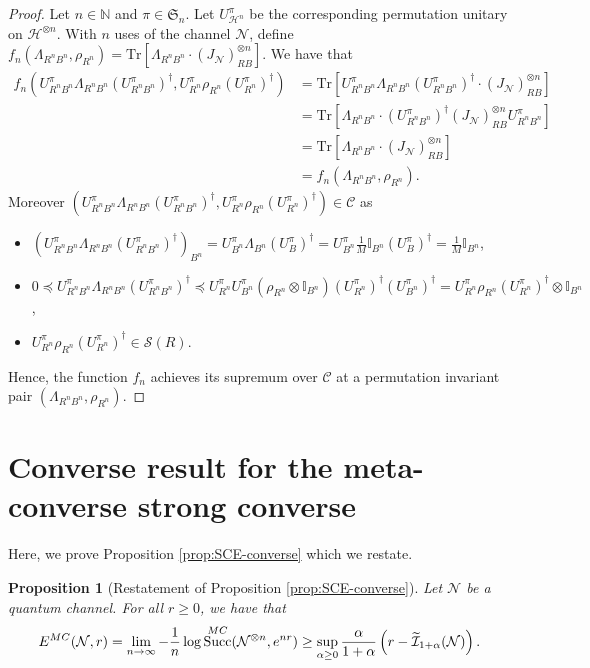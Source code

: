 \documentclass[a4paper,onecolumn,11pt,accepted=2025-10-01]{quantumarticle}
\newtheorem*{prop*}{Proposition}
\DeclareMathOperator{\suc}{Succ}
\newcommand*{\cC}{\mathcal{C}}
\newcommand*{\cH}{\mathcal{H}}
\newcommand*{\cI}{\mathcal{I}}
\newcommand*{\dI}{\mathbb{I}}
\newcommand*{\cN}{\mathcal{N}}
\newcommand*{\cS}{\mathcal{S}}
\newcommand*{\fS}{\mathfrak{S}}
\newcommand*{\tr}[1]{\mathrm{Tr}\left[#1\right]}
\newcommand*{\mle}{\preccurlyeq}
\begin{document}
\begin{proof}
Let $n\in \mathbb{N}$ and   $\pi \in \fS_n$. Let $U^\pi_{\cH^n}$ be the corresponding permutation unitary on $\cH^{\otimes n}$. With $n$ uses of the channel $\cN$, define $f_n(\Lambda_{R^nB^n}, \rho_{R^n})=\tr{\Lambda_{R^nB^n} \cdot (J_{\cN})_{RB}^{\otimes n}}$. We have that 
\begin{align}
    f_n(U^\pi_{R^nB^n} \Lambda_{R^nB^n} (U^\pi_{R^nB^n})^{\dagger}, U^\pi_{R^n} \rho_{R^n} (U^\pi_{R^n})^{\dagger} ) &= \tr{U^\pi_{R^nB^n}\Lambda_{R^nB^n}(U^\pi_{R^nB^n})^{\dagger} \cdot (J_{\cN})_{RB}^{\otimes n}}
    \\&=\tr{\Lambda_{R^nB^n} \cdot(U^\pi_{R^nB^n})^{\dagger} (J_{\cN})_{RB}^{\otimes n}U^\pi_{R^nB^n}}
    \\&= \tr{\Lambda_{R^nB^n} \cdot (J_{\cN})_{RB}^{\otimes n}}
    \\&=f_n(\Lambda_{R^nB^n}, \rho_{R^n}).
\end{align}
Moreover $(U^\pi_{R^nB^n} \Lambda_{R^nB^n} (U^\pi_{R^nB^n})^{\dagger}, U^\pi_{R^n} \rho_{R^n} (U^\pi_{R^n})^{\dagger})\in \cC$ as 
\begin{itemize}
    \item $(U^\pi_{R^nB^n} \Lambda_{R^nB^n} (U^\pi_{R^nB^n})^{\dagger})_{B^n}  = U^\pi_{B^n} \Lambda_{B^n}  (U^\pi_B)^{\dagger} = U^\pi_{B^n} \frac{1}{M}\dI_{B^n} (U^\pi_B)^{\dagger} = \frac{1}{M}\dI_{B^n} $,
    \item $0\mle U^\pi_{R^nB^n} \Lambda_{R^nB^n} (U^\pi_{R^nB^n})^{\dagger} \mle U^\pi_{R^n}U^\pi_{B^n} (\rho_{R^n} \otimes \dI_{B^n} ) (U^\pi_{R^n})^{\dagger}(U^\pi_{B^n})^{\dagger} = U^\pi_{R^n} \rho_{R^n} (U^\pi_{R^n})^{\dagger}\otimes \dI_{B^n}$, 
    \item $U^\pi_{R^n} \rho_{R^n} (U^\pi_{R^n})^{\dagger}\in \cS(R)$.
\end{itemize}
Hence,  the function $f_n$ achieves its supremum over $\cC$ at a permutation invariant pair $(\Lambda_{R^nB^n}, \rho_{R^n})$. 
\end{proof}


\section{Converse result for the meta-converse strong converse}\label{app:proof-converse}

Here, we prove Proposition \ref{prop:SCE-converse} which we restate.

\begin{prop*}[Restatement of Proposition \ref{prop:SCE-converse}]
     Let  $\cN$ be a quantum channel. For all $r\ge 0$, we have  that
 \begin{align}
     E^{\rm{MC}}(\cN, r) = \lim_{n\rightarrow \infty } - \frac{1}{n}\log \suc^{\rm{MC}}(\cN^{\otimes n}, e^{nr})  \ge \sup_{\alpha\ge 0}  \frac{\alpha}{1+\alpha}\left( r- \widetilde{\cI}_{1+\alpha}(\cN) \right). 
    \end{align}
\end{prop*}
\end{document}
